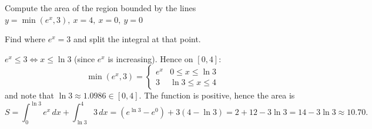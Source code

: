 
\begin{question}
Compute the area of the region bounded by the lines $y=\min\left(e^x,3\right),\ x=4,\ x=0,\ y=0$
\end{question}

\begin{hint}
Find where $e^x=3$ and split the integral at that point.
\end{hint}

\begin{solution}
$e^x\le 3\iff x\le\ln3$ (since $e^x$ is increasing). Hence on $[0,4]$:
\[ \min(e^x,3)=\begin{cases} e^x & 0\le x\le\ln 3\\ 3 & \ln3\le x\le 4\end{cases} \]
and note that $\ln3\approx1.0986\in[0,4]$. The function is positive, hence the area is
\[ S=\int_0^{\ln3}e^x\,dx+\int_{\ln3}^{4}3\,dx=\left(e^{\ln3}-e^0\right)+3(4-\ln3)=2+12-3\ln3=\boxed{14-3\ln3}\approx 10.70. \]
\end{solution}
